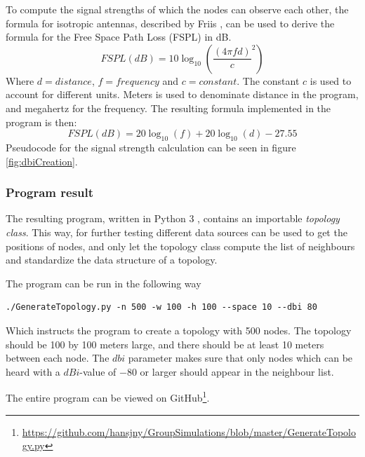 	To compute the signal strengths of which the nodes can observe each other, the formula for isotropic antennas, described by Friis \cite{Friis46}, can be used to
	derive the formula for the Free Space Path Loss (FSPL) in dB. 
\[
	FSPL(dB) = 10\log_{10} \left( \frac{ (4 \pi f d)}{c} ^2 \right) 
\]	
	Where $d = distance$, $f = frequency$ and $c=constant$. The constant $c$ is used to account for different units. Meters is used to denominate distance in the program,
	and megahertz for the frequency. The resulting formula implemented in the program is then: 
\[
	FSPL(dB) = 20\log_{10}\left( f \right)  + 20\log_{10} \left(d\right) - 27.55
\]	
	Pseudocode for the signal strength calculation can be seen in figure \ref{fig:dbiCreation}. 

	\subsubsection{Program result}
	The resulting program, written in Python 3 \cite{Python3}, contains an importable \textit{topology class}. This way, for further testing different data
	sources can be used to get the positions of nodes, and only let the topology class compute the list of neighbours and standardize the data structure of a topology.

The program can be run in the following way
\begin{verbatim}./GenerateTopology.py -n 500 -w 100 -h 100 --space 10 --dbi 80 \end{verbatim}
Which instructs the program to create a topology with 500 nodes. The topology should be 100 by 100 meters large, and there should be at least 10 meters
between each node. The $dbi$ parameter makes sure that only nodes which can be heard with a $dBi$-value of $-80$ or larger should appear in the neighbour list. 

The entire program can be viewed on GitHub\footnote{\url{https://github.com/hansjny/GroupSimulations/blob/master/GenerateTopology.py}}.


